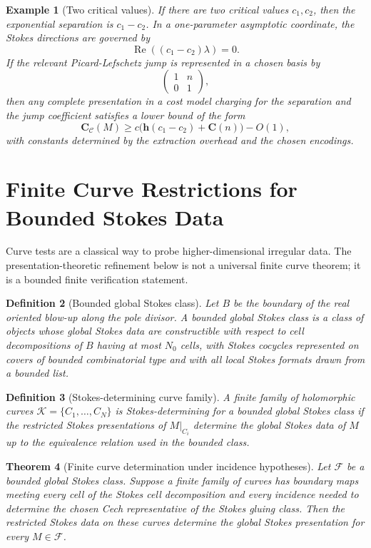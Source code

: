 \documentclass[11pt]{article}
\newtheorem{theorem}{Theorem}[section]
\newtheorem{definition}[theorem]{Definition}
\newtheorem{example}[theorem]{Example}
\begin{document}
\begin{example}[Two critical values]
If there are two critical values \(c_1,c_2\), then the exponential separation is \(c_1-c_2\).  In a one-parameter asymptotic coordinate, the Stokes directions are governed by
\[
\operatorname{Re}((c_1-c_2)\lambda)=0.
\]
If the relevant Picard-Lefschetz jump is represented in a chosen basis by
\[
\begin{pmatrix}
1 & n\\
0 & 1
\end{pmatrix},
\]
then any complete presentation in a cost model charging for the separation and the jump coefficient satisfies a lower bound of the form
\[
\mathbf C_{\mathcal C}(M)
\ge
c\bigl(\mathbf h(c_1-c_2)+\mathbf C(n)\bigr)-O(1),
\]
with constants determined by the extraction overhead and the chosen encodings.
\end{example}

\section{Finite Curve Restrictions for Bounded Stokes Data}

Curve tests are a classical way to probe higher-dimensional irregular data.  The presentation-theoretic refinement below is not a universal finite curve theorem; it is a bounded finite verification statement.

\begin{definition}[Bounded global Stokes class]
Let \(B\) be the boundary of the real oriented blow-up along the pole divisor.  A bounded global Stokes class is a class of objects whose global Stokes data are constructible with respect to cell decompositions of \(B\) having at most \(N_0\) cells, with Stokes cocycles represented on covers of bounded combinatorial type and with all local Stokes formats drawn from a bounded list.
\end{definition}

\begin{definition}[Stokes-determining curve family]
A finite family of holomorphic curves \(\mathcal K=\{C_1,\ldots,C_N\}\) is Stokes-determining for a bounded global Stokes class if the restricted Stokes presentations of \(M|_{C_i}\) determine the global Stokes data of \(M\) up to the equivalence relation used in the bounded class.
\end{definition}

\begin{theorem}[Finite curve determination under incidence hypotheses]
Let \(\mathcal F\) be a bounded global Stokes class.  Suppose a finite family of curves has boundary maps meeting every cell of the Stokes cell decomposition and every incidence needed to determine the chosen Cech representative of the Stokes gluing class.  Then the restricted Stokes data on these curves determine the global Stokes presentation for every \(M\in\mathcal F\).
\end{theorem}
\end{document}
